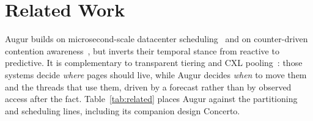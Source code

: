 \documentclass[sigconf,nonacm]{acmart}
\begin{document}
\section{Related Work}
Augur builds on microsecond-scale datacenter
scheduling~\cite{ousterhout2019shenango,fried2020caladan} and on counter-driven
contention awareness~\cite{zhuravlev2010contention,snavely2000symbiotic,
suh2002memory,fedorova2007isolation}, but inverts their temporal stance from
reactive to predictive. It is complementary to transparent tiering and CXL
pooling~\cite{maruf2023tpp,li2023pond}: those systems decide \emph{where} pages
should live, while Augur decides \emph{when} to move them and the threads that use
them, driven by a forecast rather than by observed access after the fact.
Table~\ref{tab:related} places Augur against the partitioning and scheduling
lines, including its companion design Concerto.
\end{document}
